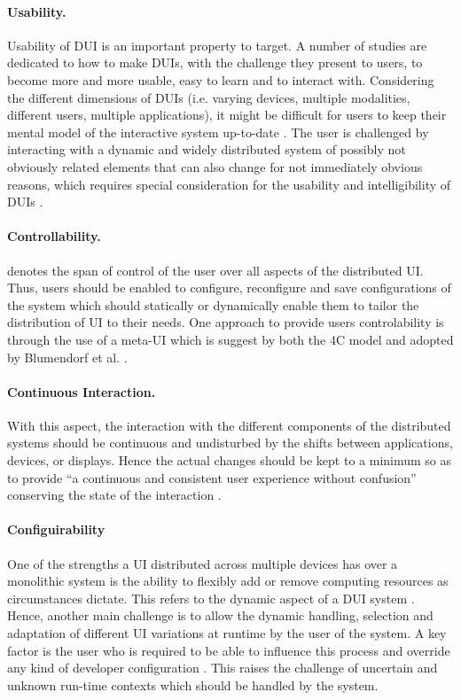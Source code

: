 \paragraph{Usability.} Usability of DUI is an important property to target.
A number of studies are dedicated to how to make DUIs, with the challenge they
present to users, to become more and more usable, easy to learn and to interact
with. Considering the different dimensions of DUIs (i.e.
varying devices, multiple modalities, different users, multiple applications),
it might be difficult for users to keep their mental model of the interactive system up-to-date \cite{blumendorf2011distributed}. The user is challenged by
interacting with a dynamic and widely distributed system of possibly not
obviously related elements that can also change for not immediately obvious
reasons, which requires special consideration for the usability and
intelligibility of DUIs \cite{blumendorf2011distributed}.
\paragraph{Controllability.} denotes the span of control of the user over all
aspects of the distributed UI. Thus, users should be enabled to configure,
reconfigure and save configurations of the system which should statically or
dynamically enable them to tailor the distribution of UI to their needs. One
approach to provide users controlability is through the use of a meta-UI which
is suggest by both the 4C model \cite{demeure20084c} and adopted by Blumendorf
et al. \cite{blumendorf2011distributed}.
\paragraph{Continuous Interaction.} With this aspect, the interaction with the
different components of the distributed systems should be continuous and
undisturbed by the shifts between applications, devices, or displays. Hence the
actual changes should be kept to a minimum so as to provide ``a continuous and consistent
user experience without confusion'' conserving the state of the
interaction \cite{blumendorf2011distributed}.
\paragraph{Configuirability} 
One of the strengths a UI distributed across multiple
devices has over a monolithic system is the ability to flexibly add or remove
computing resources as circumstances dictate. This refers to the dynamic
aspect of a DUI system \cite{chen2011distributed}. Hence, another main challenge
is to allow the dynamic handling, selection and adaptation of different UI variations at runtime by the user of the system. A key factor is the user who is
required to be able to influence this process and override any kind of developer
configuration \cite{blumendorf2011distributed}. This raises the
challenge of uncertain and unknown run-time contexts which should be handled
by the system.
